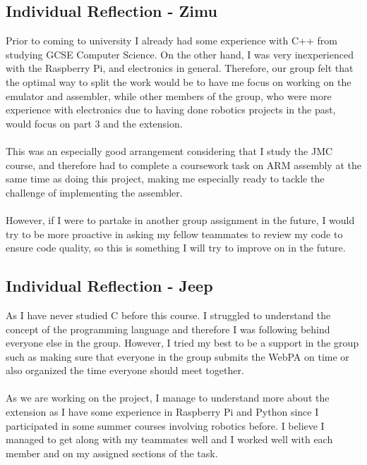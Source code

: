 \documentclass[11pt,twoside]{article}
\begin{document}
\subsection{Individual Reflection - Zimu}
Prior to coming to university I already had some experience with C++ from studying GCSE Computer Science. On the other hand, I was very inexperienced with the Raspberry Pi, and electronics in general. Therefore, our group felt that the optimal way to split the work would be to have me focus on working on the emulator and assembler, while other members of the group, who were more experience with electronics due to having done robotics projects in the past, would focus on part 3 and the extension.\\\\
This was an especially good arrangement considering that I study the JMC course, and therefore had to complete a coursework task on ARM assembly at the same time as doing this project, making me especially ready to tackle the challenge of implementing the assembler.\\\\
However, if I were to partake in another group assignment in the future, I would try to be more proactive in asking my fellow teammates to review my code to ensure code quality, so this is something I will try to improve on in the future.
\subsection{Individual Reflection - Jeep}
As I have never studied C before this course. I struggled to understand the concept of the programming language and therefore I was following behind everyone else in the group. However, I tried my best to be a support in the group such as making sure that everyone in the group submits the WebPA on time or also organized the time everyone should meet together.\\\\
As we are working on the project, I manage to understand more about the extension as I have some experience in Raspberry Pi and Python since I participated in some summer courses involving robotics before. I believe I managed to get along with my teammates well and I worked well with each member and on my assigned sections of the task.
\end{document}
